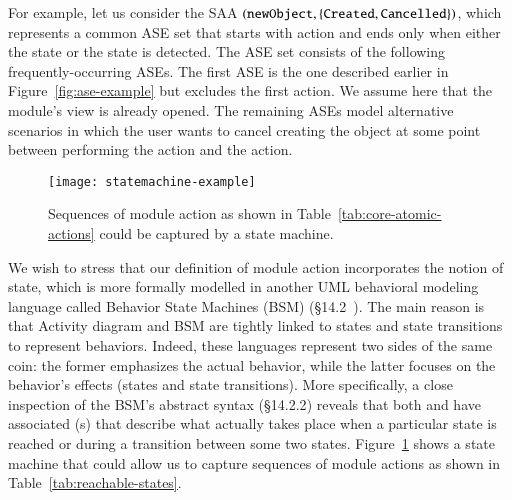 For example, let us consider the SAA $ ({\tt newObject}, \{ {\tt Created},{\tt Cancelled} \}) $, which represents a common ASE set that starts with action  and ends only when either the state  or the state  is detected. The ASE set consists of the following frequently-occurring ASEs. The 
first ASE is the one described earlier in Figure~\ref{fig:ase-example} but excludes the first action. We assume here that the module's view is already opened. The remaining ASEs model alternative scenarios in which the user wants to cancel creating the object at some point between performing the  action and the  action.
%

\begin{figure}[ht]
	\centering
	\texttt{[image: statemachine-example]}
	\caption{Sequences of module action as shown in Table~\ref{tab:core-atomic-actions} could be captured by a state machine.} %
	\label{fig:statemachine-example}
\end{figure}

 We wish to stress that our definition of module action incorporates the notion of state, which is more formally modelled in another UML behavioral modeling language called Behavior State Machines (BSM) (\S{14.2}~\cite{omg_unified_2015}). The main reason is that Activity diagram and BSM are tightly linked to states and state transitions to represent behaviors. Indeed, these languages represent two sides of the same coin: the former emphasizes the actual behavior, while the latter focuses on the behavior's effects (states and state transitions). More specifically, a close inspection of the BSM's abstract syntax (\S{14.2.2}) reveals that both  and  have associated (s) that describe what actually takes place when a particular state is reached or during a transition between some two states. Figure~\ref{fig:statemachine-example} shows a state machine that could allow us to capture sequences of module actions as shown in Table~\ref{tab:reachable-states}.



